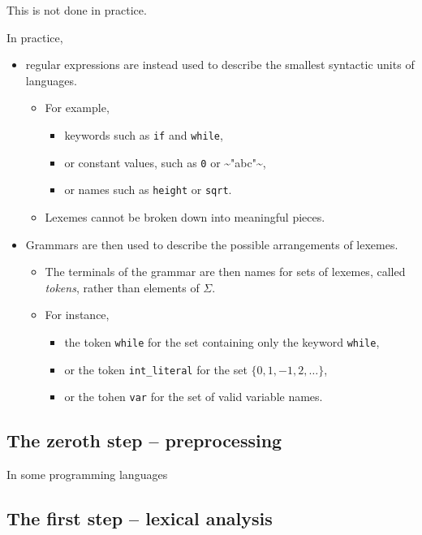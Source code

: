 \documentclass[11pt]{article}
\theoremstyle{definition}
\begin{document}
This is not done in practice.

In practice,
\begin{itemize}
\item regular expressions are instead used to describe the
smallest syntactic units of languages.
\begin{itemize}
\item For example,
\begin{itemize}
\item keywords such as \texttt{if} and \texttt{while},
\item or constant values, such as \texttt{0} or \textasciitilde{}"abc"\textasciitilde{},
\item or names such as \texttt{height} or \texttt{sqrt}.
\end{itemize}
\item Lexemes cannot be broken down into meaningful pieces.
\end{itemize}
\item Grammars are then used to describe the possible arrangements
of lexemes.
\begin{itemize}
\item The terminals of the grammar are then names for sets of lexemes,
called \emph{tokens}, rather than elements of \(Σ\).
\item For instance,
\begin{itemize}
\item the token \texttt{while} for the set containing only the
keyword \texttt{while},
\item or the token \texttt{int\_literal} for the set \(\{ 0, 1, -1, 2, … \}\),
\item or the tohen \texttt{var} for the set of valid variable names.
\end{itemize}
\end{itemize}
\end{itemize}

\subsection{The zeroth step – preprocessing}
\label{sec:org2078f63}

In some programming languages

\subsection{The first step – lexical analysis}
\label{sec:org531c235}
\end{document}
